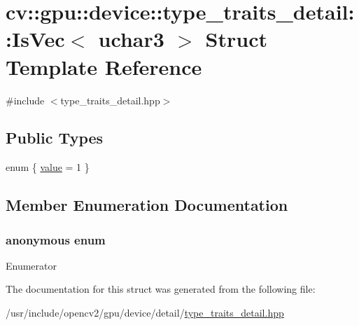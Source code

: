 \hypertarget{structcv_1_1gpu_1_1device_1_1type__traits__detail_1_1IsVec_3_01uchar3_01_4}{\section{cv\-:\-:gpu\-:\-:device\-:\-:type\-\_\-traits\-\_\-detail\-:\-:Is\-Vec$<$ uchar3 $>$ Struct Template Reference}
\label{structcv_1_1gpu_1_1device_1_1type__traits__detail_1_1IsVec_3_01uchar3_01_4}
}


{\ttfamily \#include $<$type\-\_\-traits\-\_\-detail.\-hpp$>$}

\subsection*{Public Types}
\begin{DoxyCompactItemize}
\item 
enum \{ \hyperlink{structcv_1_1gpu_1_1device_1_1type__traits__detail_1_1IsVec_3_01uchar3_01_4_af554c6f59efc777a53573051fdab12b5a20b620472d0870e6852d750749510852}{value} = 1
 \}
\end{DoxyCompactItemize}


\subsection{Member Enumeration Documentation}
\hypertarget{structcv_1_1gpu_1_1device_1_1type__traits__detail_1_1IsVec_3_01uchar3_01_4_af554c6f59efc777a53573051fdab12b5}{\subsubsection[{anonymous enum}]{\setlength{\rightskip}{0pt plus 5cm}anonymous enum}}\label{structcv_1_1gpu_1_1device_1_1type__traits__detail_1_1IsVec_3_01uchar3_01_4_af554c6f59efc777a53573051fdab12b5}
\begin{Desc}
\item[Enumerator]\par
\begin{description}
\item[{\em 
\hypertarget{structcv_1_1gpu_1_1device_1_1type__traits__detail_1_1IsVec_3_01uchar3_01_4_af554c6f59efc777a53573051fdab12b5a20b620472d0870e6852d750749510852}{value}\label{structcv_1_1gpu_1_1device_1_1type__traits__detail_1_1IsVec_3_01uchar3_01_4_af554c6f59efc777a53573051fdab12b5a20b620472d0870e6852d750749510852}
}]\end{description}
\end{Desc}


The documentation for this struct was generated from the following file\-:\begin{DoxyCompactItemize}
\item 
/usr/include/opencv2/gpu/device/detail/\hyperlink{type__traits__detail_8hpp}{type\-\_\-traits\-\_\-detail.\-hpp}\end{DoxyCompactItemize}

